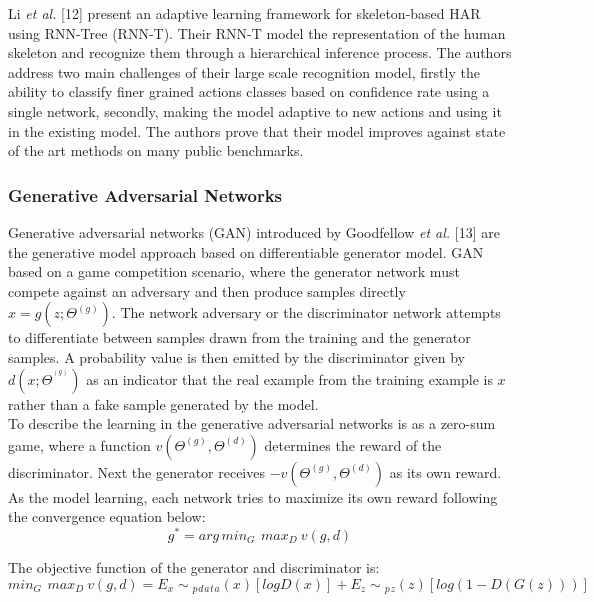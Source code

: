 \hspace{5mm} Li \textit{et al.} [12] present an adaptive learning framework for skeleton-based HAR using RNN-Tree (RNN-T). Their RNN-T model the representation of the human skeleton and recognize them through a hierarchical inference process. The authors address two main challenges of their large scale recognition model, firstly the ability to classify finer grained actions classes based on confidence rate using a single network, secondly, making the model adaptive to new actions and using it in the existing model. The authors prove that their model improves against state of the art methods on many public benchmarks.

\subsubsection{Generative Adversarial Networks}
\hspace{5mm} Generative adversarial networks (GAN) introduced by Goodfellow \textit{et al.} [13] are the generative model approach based on differentiable generator model. GAN based on a game competition scenario, where the generator network must compete against an adversary and then produce samples directly $x = g(z;\Theta ^{(g)})$. The network adversary or the discriminator network attempts to differentiate between samples drawn from the training and the generator samples. A probability value is then emitted by the discriminator given by $d(x;\Theta ^{^{(g)}})$ as an indicator that the real example from the training example is $x$ rather than a fake sample generated by the model.\\

To describe the learning in the generative adversarial networks is as a zero-sum game, where a function $v(\Theta ^{(g)},\Theta ^{(d)})$ determines the reward of the discriminator. Next the generator receives $-v(\Theta ^{(g)},\Theta ^{(d)})$ as its own reward. As the model learning, each network tries to maximize its own reward following the convergence equation below:
\begin{equation}
    g^{*} = arg\,min{_G}\,\: max{_D}\: v(g,d)
\end{equation}

The objective function of the generator and discriminator is:
\begin{equation}
    min{_G}\,\: max{_D}\: v(g,d) = E{_x\sim {_p{_d}{_a}{_t}{_a}(x)}}[logD(x)] + E{_z\sim {_p}{_z}(z)}[{log(1 - D(G(z)))}]
\end{equation}

